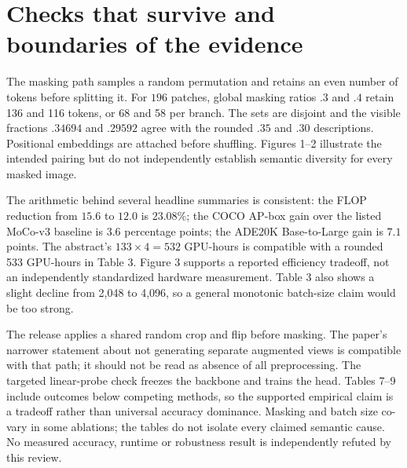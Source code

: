 \documentclass[10pt]{article}
\begin{document}
\section*{Checks that survive and boundaries of the evidence}
The masking path samples a random permutation and retains an even number of tokens before splitting it. For \(196\) patches, global masking ratios \(.3\) and \(.4\) retain 136 and 116 tokens, or 68 and 58 per branch. The sets are disjoint and the visible fractions \(.34694\) and \(.29592\) agree with the rounded \(.35\) and \(.30\) descriptions. Positional embeddings are attached before shuffling. Figures 1–2 illustrate the intended pairing but do not independently establish semantic diversity for every masked image.\par
The arithmetic behind several headline summaries is consistent: the FLOP reduction from \(15.6\) to \(12.0\) is \(23.08\%\); the COCO AP-box gain over the listed MoCo-v3 baseline is \(3.6\) percentage points; the ADE20K Base-to-Large gain is \(7.1\) points. The abstract’s \(133\times4=532\) GPU-hours is compatible with a rounded 533 GPU-hours in Table 3. Figure 3 supports a reported efficiency tradeoff, not an independently standardized hardware measurement. Table 3 also shows a slight decline from 2,048 to 4,096, so a general monotonic batch-size claim would be too strong.\par
The release applies a shared random crop and flip before masking. The paper’s narrower statement about not generating separate augmented views is compatible with that path; it should not be read as absence of all preprocessing. The targeted linear-probe check freezes the backbone and trains the head. Tables 7–9 include outcomes below competing methods, so the supported empirical claim is a tradeoff rather than universal accuracy dominance. Masking and batch size co-vary in some ablations; the tables do not isolate every claimed semantic cause. No measured accuracy, runtime or robustness result is independently refuted by this review.\par
\end{document}

